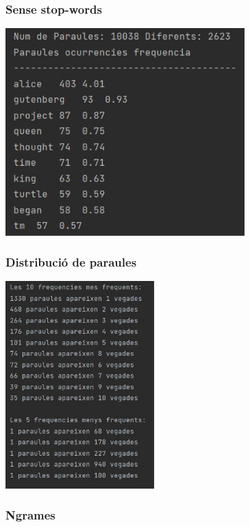 \documentclass[11pt,a4paper]{article}
\begin{document}
		\subsubsection{Sense stop-words}
		
			\begin{center}
				\includegraphics[height=8cm]{captures/primeraPart/sensestopwords/execucio.jpg}
			\end{center}
		
		\subsubsection{Distribució de paraules}
		
			\begin{center}
				\includegraphics[height=8cm]{captures/primeraPart/distribucioParaules/execucio.jpg}
			\end{center}
		
		\subsubsection{Ngrames}
		
\end{document}
